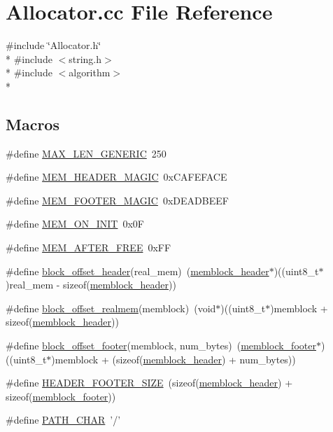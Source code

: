 \section{Allocator.\-cc File Reference}
\label{_allocator_8cc}
{\ttfamily \#include \char`\"{}Allocator.\-h\char`\"{}}\\*
{\ttfamily \#include $<$string.\-h$>$}\\*
{\ttfamily \#include $<$algorithm$>$}\\*
\subsection*{Macros}
\begin{DoxyCompactItemize}
\item 
\#define \hyperlink{_allocator_8cc_ae6dbf32c394f00509d560b40c81bccc6}{M\-A\-X\-\_\-\-L\-E\-N\-\_\-\-G\-E\-N\-E\-R\-I\-C}~250
\item 
\#define \hyperlink{_allocator_8cc_a2db6c9af5aa02be13a49f706da54385c}{M\-E\-M\-\_\-\-H\-E\-A\-D\-E\-R\-\_\-\-M\-A\-G\-I\-C}~0x\-C\-A\-F\-E\-F\-A\-C\-E
\item 
\#define \hyperlink{_allocator_8cc_adb9b241eeb9083c288e77112c7e7b0a5}{M\-E\-M\-\_\-\-F\-O\-O\-T\-E\-R\-\_\-\-M\-A\-G\-I\-C}~0x\-D\-E\-A\-D\-B\-E\-E\-F
\item 
\#define \hyperlink{_allocator_8cc_ada833569779d8c8a9b8415e8112c1fad}{M\-E\-M\-\_\-\-O\-N\-\_\-\-I\-N\-I\-T}~0x0\-F
\item 
\#define \hyperlink{_allocator_8cc_ab4cd30097b76edd986e9f0db035b6279}{M\-E\-M\-\_\-\-A\-F\-T\-E\-R\-\_\-\-F\-R\-E\-E}~0x\-F\-F
\item 
\#define \hyperlink{_allocator_8cc_a4535345fe0fa840b2b74ce4eaf6dd004}{block\-\_\-offset\-\_\-header}(real\-\_\-mem)~(\hyperlink{structmemblock__header}{memblock\-\_\-header}$\ast$)((uint8\-\_\-t$\ast$)real\-\_\-mem -\/ sizeof(\hyperlink{structmemblock__header}{memblock\-\_\-header}))
\item 
\#define \hyperlink{_allocator_8cc_ad4ec1862e1c0007f85c0d0eb6b75ff91}{block\-\_\-offset\-\_\-realmem}(memblock)~(void$\ast$)((uint8\-\_\-t$\ast$)memblock + sizeof(\hyperlink{structmemblock__header}{memblock\-\_\-header}))
\item 
\#define \hyperlink{_allocator_8cc_aff46be828cb143ee0ffde154ac547a46}{block\-\_\-offset\-\_\-footer}(memblock, num\-\_\-bytes)~(\hyperlink{structmemblock__footer}{memblock\-\_\-footer}$\ast$)((uint8\-\_\-t$\ast$)memblock + (sizeof(\hyperlink{structmemblock__header}{memblock\-\_\-header}) + num\-\_\-bytes))
\item 
\#define \hyperlink{_allocator_8cc_a23fcee323662954abeea9a2b0d3d7bdf}{H\-E\-A\-D\-E\-R\-\_\-\-F\-O\-O\-T\-E\-R\-\_\-\-S\-I\-Z\-E}~(sizeof(\hyperlink{structmemblock__header}{memblock\-\_\-header}) + sizeof(\hyperlink{structmemblock__footer}{memblock\-\_\-footer}))
\item 
\#define \hyperlink{_allocator_8cc_a83cebbffc784c0755f531e4c19abf8d0}{P\-A\-T\-H\-\_\-\-C\-H\-A\-R}~'/'
\end{DoxyCompactItemize}
